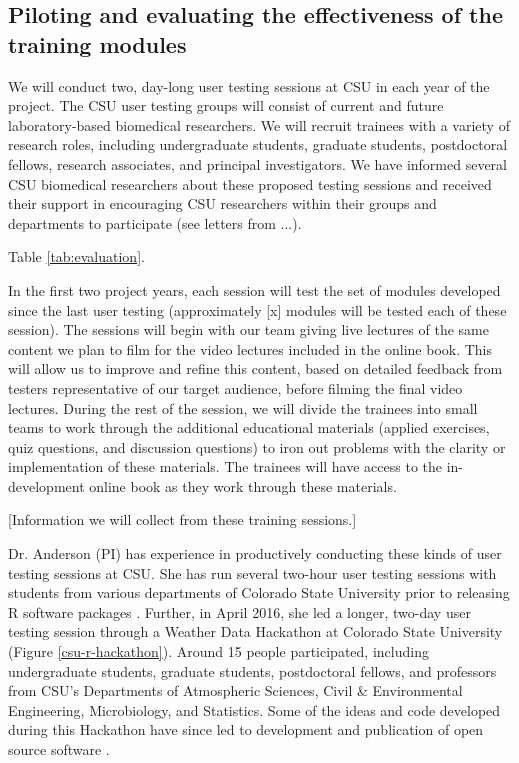 \documentclass[pdftex,english,11pt,parskip=half]{scrartcl}
\begin{document}
\subsection{Piloting and evaluating the effectiveness of the training modules}

We will conduct two, day-long user testing sessions at CSU in each year of the
project. The CSU user testing groups will consist of current and future
laboratory-based biomedical researchers. We will recruit trainees with a variety
of research roles, including undergraduate students, graduate students,
postdoctoral fellows, research associates, and principal investigators. We have
informed several CSU biomedical researchers about these proposed testing
sessions and received their support in encouraging CSU researchers within their
groups and departments to participate (see letters from ...). 

Table \ref{tab:evaluation}.

In the first two project years, each session will test the set of modules
developed since the last user testing (approximately [x] modules will be tested
each of these session). The sessions will begin with our team giving live
lectures of the same content we plan to film for the video lectures included in
the online book. This will allow us to improve and refine this content, based on
detailed feedback from testers representative of our target audience, before
filming the final video lectures. During the rest of the session, we will divide
the trainees into small teams to work through the additional educational
materials (applied exercises, quiz questions, and discussion questions) to iron
out problems with the clarity or implementation of these materials. The trainees
will have access to the in-development online book as they work through these
materials.

[Information we will collect from these training sessions.]

Dr. Anderson (PI) has experience in productively conducting these kinds of user
testing sessions at CSU. She has run several two-hour user testing sessions with
students from various departments of Colorado State University prior to
releasing R software packages \cite{futureheatwaves, countyweather}. Further, in
April 2016, she led a longer, two-day user testing session through a Weather
Data Hackathon at Colorado State University (Figure \ref{csu-r-hackathon}).
Around 15 people participated, including undergraduate students, graduate
students, postdoctoral fellows, and professors from CSU's Departments of
Atmospheric Sciences, Civil \& Environmental Engineering, Microbiology, and
Statistics. Some of the ideas and code developed during this Hackathon have
since led to development and publication of open source software
\cite{countyfloods, noaastormevents}.
\end{document}
